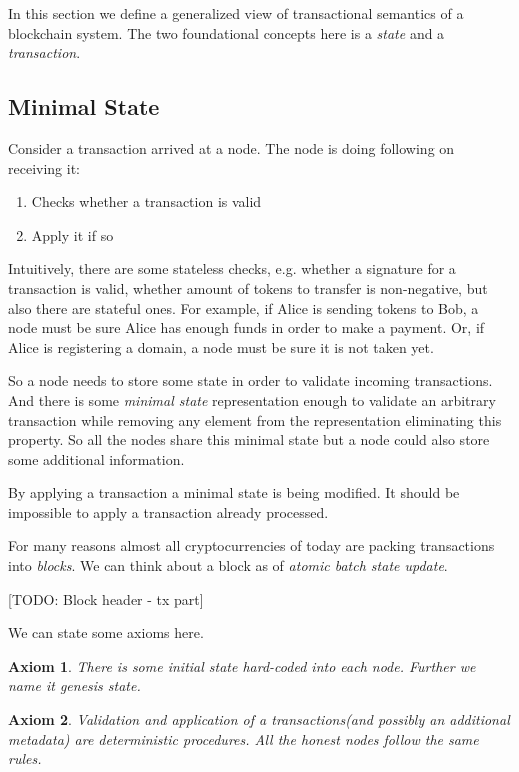 \documentclass[]{report}   %
\newtheorem{axiom}{Axiom}
\begin{document}
In this section we define a generalized view of transactional semantics of a blockchain system. The two foundational concepts here is a \textit{state} and a \textit{transaction}.

\subsection{Minimal State}     %
	Consider a transaction arrived at a node. The node is doing following on receiving it:

    \begin{enumerate}
		\item Checks whether a transaction is valid
		\item Apply it if so
    \end{enumerate}

	Intuitively, there are some stateless checks, e.g. whether a signature for a transaction is valid, whether amount of tokens to transfer is non-negative, but also there are stateful ones. For example, if Alice is sending tokens to Bob, a node must be sure Alice has enough funds in order to make a payment. Or, if Alice is registering a domain, a node must be sure it is not taken yet. 

	So a node needs to store some state in order to validate incoming transactions. And there is some \textit{minimal state} representation enough to validate an arbitrary transaction while removing any element from the representation eliminating this property. So all the nodes share this minimal state but a node could also store some additional information. 

	By applying a transaction a minimal state is being modified. It should be impossible to apply a transaction already processed. 

	For many reasons almost all cryptocurrencies of today are packing transactions into \textit{blocks}. We can think about a block as of \textit{atomic batch state update}. 

    [TODO: Block header - tx part]


	We can state some axioms here.

	\begin{axiom}
	 There is some initial state hard-coded into each node. Further we name it \textit{genesis state}.
	\end{axiom}

    \begin{axiom} 
     Validation and application of a transactions(and possibly an additional metadata) are deterministic procedures. All the honest nodes follow the same rules. 
    \end{axiom}
\end{document}
